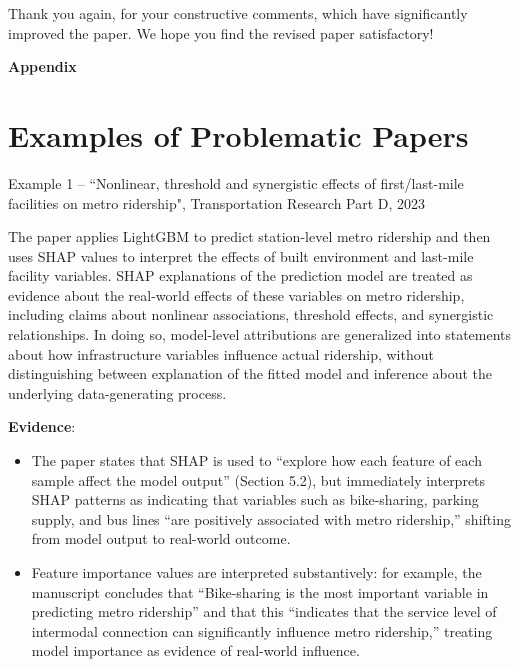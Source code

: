 \documentclass[11pt]{article}
\newcounter{se}[section]
\begin{document}
\vspace*{0.5\baselineskip}

\textsf{Thank you again, for your constructive comments, which have significantly improved the paper. We hope you find the revised paper satisfactory!}

% 
% 
\newpage
\appendix
\noindent\huge\textbf{Appendix}
\normalsize
\section{Examples of Problematic Papers}\label{app:examples}
\begin{mainbox}{Example 1 – ``Nonlinear, threshold and synergistic effects of first/last-mile facilities on metro ridership", Transportation Research Part D, 2023}

The paper applies LightGBM to predict station-level metro ridership and then uses SHAP values to interpret the effects of built environment and last-mile facility variables. SHAP explanations of the prediction model are treated as evidence about the real-world effects of these variables on metro ridership, including claims about nonlinear associations, threshold effects, and synergistic relationships. In doing so, model-level attributions are generalized into statements about how infrastructure variables influence actual ridership, without distinguishing between explanation of the fitted model and inference about the underlying data-generating process.

\vspace{0.2cm}

\textbf{Evidence}:
\begin{itemize}

\item The paper states that SHAP is used to “explore how each feature of each sample affect the model output” (Section 5.2), but immediately interprets SHAP patterns as indicating that variables such as bike-sharing, parking supply, and bus lines “are positively associated with metro ridership,” shifting from model output to real-world outcome.

\item Feature importance values are interpreted substantively: for example, the manuscript concludes that “Bike-sharing is the most important variable in predicting metro ridership” and that this “indicates that the service level of intermodal connection can significantly influence metro ridership,” treating model importance as evidence of real-world influence.


\end{itemize}
\end{mainbox}
\end{document}
